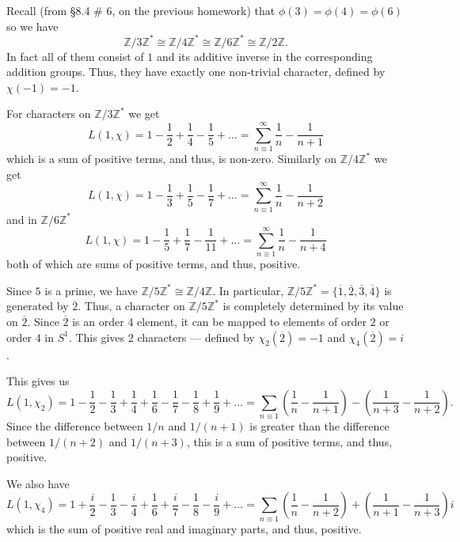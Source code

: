 \documentclass[12 pt, letterpaper]{hmcpset}
\begin{document}
\begin{solution}
	Recall (from \S 8.4 \# 6, on the previous homework) that $\phi(3) = \phi(4) = \phi(6)$ so we have \[
		\mathbb{Z} / 3 \mathbb{Z}^{*} \cong \mathbb{Z} / 4 \mathbb{Z}^{*} \cong \mathbb{Z} / 6 \mathbb{Z}^{*} \cong \mathbb{Z} / 2 \mathbb{Z}.
	\]
	In fact all of them consist of $1$ and its additive inverse in the corresponding addition groups. Thus, they have exactly one non-trivial character, defined by $\chi(-1) = -1$.

	For characters on $\mathbb{Z} / 3 \mathbb{Z}^{*}$ we get
	\[
		L(1, \chi) = 1 - \frac{1}{2} + \frac{1}{4} - \frac{1}{5} + \dots = \sum_{n \equiv 1}^{\infty} \frac{1}{n} - \frac{1}{n + 1}
	\]
	which is a sum of positive terms, and thus, is non-zero. Similarly on $\mathbb{Z} / 4 \mathbb{Z}^{*}$ we get
	\[
		L(1, \chi) = 1 - \frac{1}{3} + \frac{1}{5} - \frac{1}{7} + \dots = \sum_{n \equiv 1}^{\infty} \frac{1}{n} - \frac{1}{n + 2}
	\]
	and in $\mathbb{Z} / 6 \mathbb{Z}^{*}$ 
	\[
		L(1, \chi) = 1 - \frac{1}{5} + \frac{1}{7} - \frac{1}{11} + \dots = \sum_{n \equiv 1}^{\infty} \frac{1}{n} - \frac{1}{n + 4}
	\]
	both of which are sums of positive terms, and thus, positive.

	Since $5$ is a prime, we have $\mathbb{Z} / 5 \mathbb{Z}^{*} \cong \mathbb{Z} / 4 \mathbb{Z}$. In particular, $\mathbb{Z} / 5 \mathbb{Z}^{*} = \{ \overline{1}, \overline{2}, \overline{3}, \overline{4} \}$ is generated by $\overline{2}$. Thus, a character on $\mathbb{Z} / 5 \mathbb{Z}^{*}$ is completely determined by its value on $\overline{2}$. Since $\overline{2}$ is an order $4$ element, it can be mapped to elements of order $2$ or order $4$ in $S^{1}$. This gives $2$ characters --- defined by $\chi_{2}(\overline{2}) = -1$ and $\chi_{4}(\overline{2}) = i$.

	This gives us
	\[
		L(1, \chi_{2}) = 1 - \frac{1}{2} - \frac{1}{3} + \frac{1}{4} + \frac{1}{6} - \frac{1}{7} - \frac{1}{8} + \frac{1}{9} + \dots = \sum_{n \equiv 1} \left ( \frac{1}{n} - \frac{1}{n + 1} \right ) - \left ( \frac{1}{n + 3} - \frac{1}{n + 2} \right ).
	\]
	Since the difference between $1 / n$ and $1 / (n + 1)$ is greater than the difference between $1 / (n + 2)$ and $1 / (n + 3)$, this is a sum of positive terms, and thus, positive.

	We also have
	\[
		L(1, \chi_{4}) = 1 + \frac{i}{2} - \frac{1}{3} - \frac{i}{4} + \frac{1}{6} + \frac{i}{7} - \frac{1}{8} - \frac{i}{9} + \dots = \sum_{n \equiv 1} \left ( \frac{1}{n} - \frac{1}{n + 2} \right ) + \left ( \frac{1}{n + 1} - \frac{1}{n + 3} \right ) i
	\]
	which is the sum of positive real and imaginary parts, and thus, positive.
\end{solution}
\end{document}
